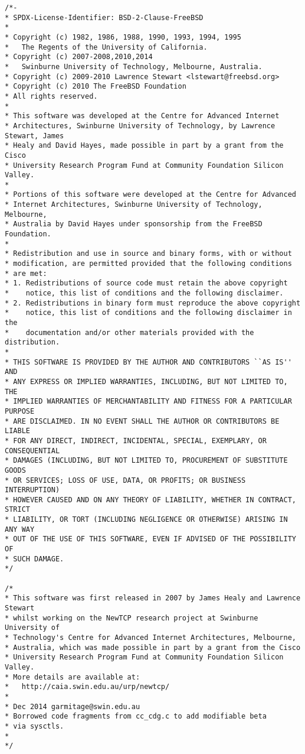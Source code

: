 \begin{code}
\begin{verbatim}
/*-
* SPDX-License-Identifier: BSD-2-Clause-FreeBSD
*
* Copyright (c) 1982, 1986, 1988, 1990, 1993, 1994, 1995
*	The Regents of the University of California.
* Copyright (c) 2007-2008,2010,2014
*	Swinburne University of Technology, Melbourne, Australia.
* Copyright (c) 2009-2010 Lawrence Stewart <lstewart@freebsd.org>
* Copyright (c) 2010 The FreeBSD Foundation
* All rights reserved.
*
* This software was developed at the Centre for Advanced Internet
* Architectures, Swinburne University of Technology, by Lawrence Stewart, James
* Healy and David Hayes, made possible in part by a grant from the Cisco
* University Research Program Fund at Community Foundation Silicon Valley.
*
* Portions of this software were developed at the Centre for Advanced
* Internet Architectures, Swinburne University of Technology, Melbourne,
* Australia by David Hayes under sponsorship from the FreeBSD Foundation.
*
* Redistribution and use in source and binary forms, with or without
* modification, are permitted provided that the following conditions
* are met:
* 1. Redistributions of source code must retain the above copyright
*    notice, this list of conditions and the following disclaimer.
* 2. Redistributions in binary form must reproduce the above copyright
*    notice, this list of conditions and the following disclaimer in the
*    documentation and/or other materials provided with the distribution.
*
* THIS SOFTWARE IS PROVIDED BY THE AUTHOR AND CONTRIBUTORS ``AS IS'' AND
* ANY EXPRESS OR IMPLIED WARRANTIES, INCLUDING, BUT NOT LIMITED TO, THE
* IMPLIED WARRANTIES OF MERCHANTABILITY AND FITNESS FOR A PARTICULAR PURPOSE
* ARE DISCLAIMED. IN NO EVENT SHALL THE AUTHOR OR CONTRIBUTORS BE LIABLE
* FOR ANY DIRECT, INDIRECT, INCIDENTAL, SPECIAL, EXEMPLARY, OR CONSEQUENTIAL
* DAMAGES (INCLUDING, BUT NOT LIMITED TO, PROCUREMENT OF SUBSTITUTE GOODS
* OR SERVICES; LOSS OF USE, DATA, OR PROFITS; OR BUSINESS INTERRUPTION)
* HOWEVER CAUSED AND ON ANY THEORY OF LIABILITY, WHETHER IN CONTRACT, STRICT
* LIABILITY, OR TORT (INCLUDING NEGLIGENCE OR OTHERWISE) ARISING IN ANY WAY
* OUT OF THE USE OF THIS SOFTWARE, EVEN IF ADVISED OF THE POSSIBILITY OF
* SUCH DAMAGE.
*/

/*
* This software was first released in 2007 by James Healy and Lawrence Stewart
* whilst working on the NewTCP research project at Swinburne University of
* Technology's Centre for Advanced Internet Architectures, Melbourne,
* Australia, which was made possible in part by a grant from the Cisco
* University Research Program Fund at Community Foundation Silicon Valley.
* More details are available at:
*   http://caia.swin.edu.au/urp/newtcp/
*
* Dec 2014 garmitage@swin.edu.au
* Borrowed code fragments from cc_cdg.c to add modifiable beta
* via sysctls.
*
*/


\end{verbatim}
\end{code}
